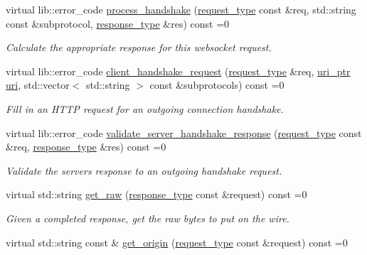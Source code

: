 \begin{DoxyCompactItemize}
virtual lib\+::error\+\_\+code \hyperlink{classwebsocketpp_1_1processor_1_1processor_a64caf3ebac5333112f48eec496ec2a47}{process\+\_\+handshake} (\hyperlink{classwebsocketpp_1_1http_1_1parser_1_1request}{request\+\_\+type} const \&req, std\+::string const \&subprotocol, \hyperlink{classwebsocketpp_1_1http_1_1parser_1_1response}{response\+\_\+type} \&res) const =0
\begin{DoxyCompactList}\small\item\em Calculate the appropriate response for this websocket request. \end{DoxyCompactList}\item 
virtual lib\+::error\+\_\+code \hyperlink{classwebsocketpp_1_1processor_1_1processor_ab5bc7b8f480ee28049f44232115bcaab}{client\+\_\+handshake\+\_\+request} (\hyperlink{classwebsocketpp_1_1http_1_1parser_1_1request}{request\+\_\+type} \&req, \hyperlink{namespacewebsocketpp_aae370ea5ac83a8ece7712cb39fc23f5b}{uri\+\_\+ptr} \hyperlink{classwebsocketpp_1_1uri}{uri}, std\+::vector$<$ std\+::string $>$ const \&subprotocols) const =0
\begin{DoxyCompactList}\small\item\em Fill in an H\+T\+TP request for an outgoing connection handshake. \end{DoxyCompactList}\item 
virtual lib\+::error\+\_\+code \hyperlink{classwebsocketpp_1_1processor_1_1processor_ab1228fa9350d9646379888ad528fd4c4}{validate\+\_\+server\+\_\+handshake\+\_\+response} (\hyperlink{classwebsocketpp_1_1http_1_1parser_1_1request}{request\+\_\+type} const \&req, \hyperlink{classwebsocketpp_1_1http_1_1parser_1_1response}{response\+\_\+type} \&res) const =0
\begin{DoxyCompactList}\small\item\em Validate the server\textquotesingle{}s response to an outgoing handshake request. \end{DoxyCompactList}\item 
virtual std\+::string \hyperlink{classwebsocketpp_1_1processor_1_1processor_a55ed343fecfcce5f312a2d0bc52c507e}{get\+\_\+raw} (\hyperlink{classwebsocketpp_1_1http_1_1parser_1_1response}{response\+\_\+type} const \&request) const =0\hypertarget{classwebsocketpp_1_1processor_1_1processor_a55ed343fecfcce5f312a2d0bc52c507e}{}\label{classwebsocketpp_1_1processor_1_1processor_a55ed343fecfcce5f312a2d0bc52c507e}

\begin{DoxyCompactList}\small\item\em Given a completed response, get the raw bytes to put on the wire. \end{DoxyCompactList}\item 
virtual std\+::string const  \& \hyperlink{classwebsocketpp_1_1processor_1_1processor_a76bcddf82275747217c945e78a91658f}{get\+\_\+origin} (\hyperlink{classwebsocketpp_1_1http_1_1parser_1_1request}{request\+\_\+type} const \&request) const =0\hypertarget{classwebsocketpp_1_1processor_1_1processor_a76bcddf82275747217c945e78a91658f}{}\label{classwebsocketpp_1_1processor_1_1processor_a76bcddf82275747217c945e78a91658f}


\end{DoxyCompactItemize}
